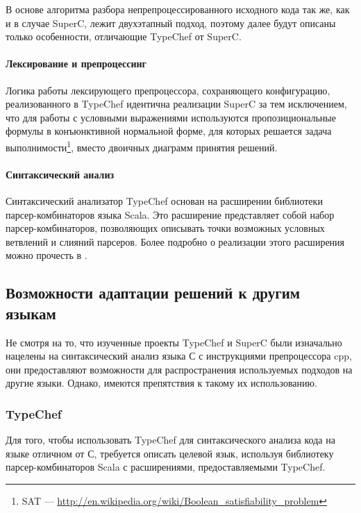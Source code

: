 В основе алгоритма разбора непрепроцессированного исходного кода  так же, как и в случае SuperC, лежит двухэтапный подход, поэтому далее будут описаны только особенности, отличающие TypeChef от SuperC.

\paragraph{Лексирование и препроцессинг}

Логика работы лексирующего препроцессора, сохраняющего конфигурацию, реализованного в TypeChef идентична реализации SuperC за тем исключением, что для работы с условными выражениями используются пропозициональные формулы в конъюнктивной нормальной форме, для которых решается задача выполнимости\footnote{SAT --- \url{http://en.wikipedia.org/wiki/Boolean\_satisfiability\_problem}}, вместо двоичных диаграмм принятия решений. 

\paragraph{Синтаксический анализ}

Синтаксический анализатор TypeChef основан на расширении библиотеки парсер-комбинаторов языка Scala. Это расширение представляет собой набор парсер-комбинаторов, позволяющих описывать точки возможных условных ветвлений и слияний парсеров. Более подробно о реализации этого расширения можно прочесть в \cite{typechef2}.


\subsection{Возможности адаптации решений к другим языкам}
\label{subsec:solutionsadaptation}

Не смотря на то, что изученные проекты TypeChef и SuperC были изначально нацелены на синтаксический анализ языка С с инструкциями препроцессора cpp, они предоставляют возможности для распространения используемых подходов на другие языки. Однако, имеются препятствия к такому их использованию.

\subsubsection{TypeChef}

Для того, чтобы использовать TypeChef для синтаксического анализа кода на языке отличном от С, требуется описать целевой язык, используя библиотеку парсер-комбинаторов Scala с расширениями, предоставляемыми TypeChef.

